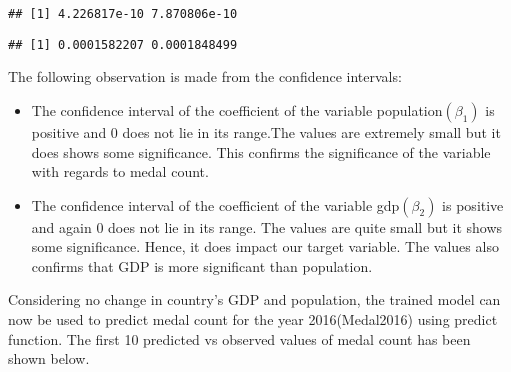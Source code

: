 \documentclass[
]{article}
\newenvironment{Shaded}{\begin{snugshade}}{\end{snugshade}}
\newcommand{\CommentTok}[1]{\textcolor[rgb]{0.56,0.35,0.01}{\textit{#1}}}
\newcommand{\DecValTok}[1]{\textcolor[rgb]{0.00,0.00,0.81}{#1}}
\newcommand{\FunctionTok}[1]{\textcolor[rgb]{0.00,0.00,0.00}{#1}}
\newcommand{\NormalTok}[1]{#1}
\newcommand{\OtherTok}[1]{\textcolor[rgb]{0.56,0.35,0.01}{#1}}
\newcommand{\SpecialCharTok}[1]{\textcolor[rgb]{0.00,0.00,0.00}{#1}}
\providecommand{\tightlist}{%
  \setlength{\itemsep}{0pt}\setlength{\parskip}{0pt}}
\begin{document}
\begin{verbatim}
## [1] 4.226817e-10 7.870806e-10
\end{verbatim}

\begin{Shaded}
\end{Shaded}

\begin{verbatim}
## [1] 0.0001582207 0.0001848499
\end{verbatim}

The following observation is made from the confidence intervals:

\begin{itemize}
\tightlist
\item
  The confidence interval of the coefficient of the variable
  population\((\beta_1)\) is positive and \(0\) does not lie in its
  range.The values are extremely small but it does shows some
  significance. This confirms the significance of the variable with
  regards to medal count.
\item
  The confidence interval of the coefficient of the variable
  gdp\((\beta_2)\) is positive and again \(0\) does not lie in its
  range. The values are quite small but it shows some significance.
  Hence, it does impact our target variable. The values also confirms
  that GDP is more significant than population.
\end{itemize}

Considering no change in country's GDP and population, the trained model
can now be used to predict medal count for the year 2016(Medal2016)
using predict function. The first 10 predicted vs observed values of
medal count has been shown below.
\end{document}
